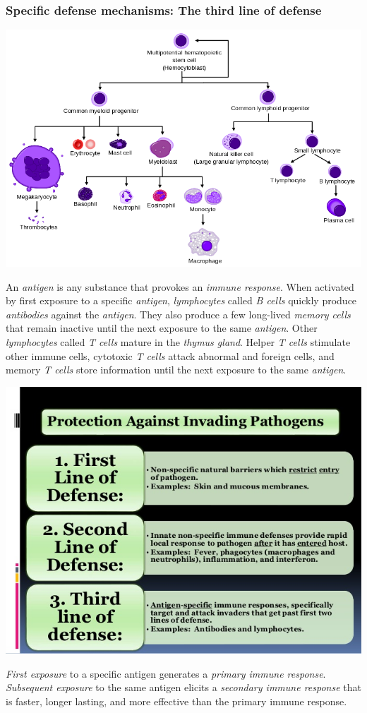 \documentclass[11pt]{article}
\begin{document}
\subsubsection{Specific defense mechanisms: The third line of defense}
\label{sec:org2b30fbd}
\begin{center}
\includegraphics[width=.9\linewidth]{Ch. 9/800px-Hematopoiesis_simple.svg_2016-11-16_23-24-26.png}
\end{center}
An \emph{antigen} is any substance that provokes an \emph{immune response}. When activated by
first exposure to a specific \emph{antigen}, \emph{lymphocytes} called \emph{B cells} quickly produce
\emph{antibodies} against the \emph{antigen}. They also produce a few long-lived \emph{memory cells}
that remain inactive until the next exposure to the same \emph{antigen}. Other
\emph{lymphocytes} called \emph{T cells} mature in the \emph{thymus gland}. Helper \emph{T cells} stimulate
other immune cells, cytotoxic \emph{T cells} attack abnormal and foreign cells, and
memory \emph{T cells} store information until the next exposure to the same \emph{antigen}.

\begin{center}
\includegraphics[width=.9\linewidth]{Ch. 9/nonspecific-immune-response-3-638_2016-11-16_21-26-16.jpeg}
\end{center} \emph{First
exposure} to a specific antigen generates a \emph{primary immune response}. \emph{Subsequent
exposure} to the same antigen elicits a \emph{secondary immune response} that is faster,
longer lasting, and more effective than the primary immune response.
\end{document}
